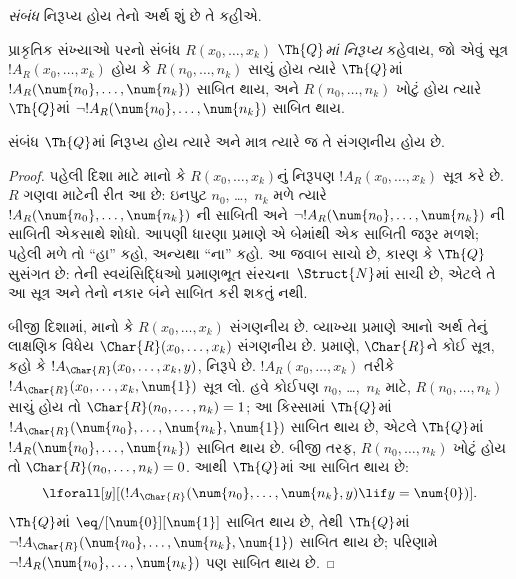\begingroup
\makeatletter{}\makeatother


\label{guunit:OLP-0298}


\emph{સંબંધ} નિરૂપ્ય હોય તેનો
અર્થ શું છે તે કહીએ.

\begin{defn}
પ્રાકૃતિક સંખ્યાઓ પરનો સંબંધ
$R(x_0,\dots,x_k)$ {\em
$\Th{Q}$માં નિરૂપ્ય} કહેવાય,
જો એવું સૂત્ર $!A_R(x_0,\dots,x_k)$
હોય કે $R(n_0,\dots,n_k)$
સાચું હોય ત્યારે
$\Th{Q}$માં
$!A_R(\num{n_0},\dots,\num{n_k})$
સાબિત થાય, અને
$R(n_0,\dots,n_k)$ ખોટું હોય
ત્યારે $\Th{Q}$માં
$\lnot !A_R(\num{n_0},
\dots, \num{n_k})$ સાબિત થાય.
\end{defn}

\begin{thm}
સંબંધ $\Th{Q}$માં નિરૂપ્ય
હોય ત્યારે અને માત્ર ત્યારે જ
તે સંગણનીય હોય છે.
\end{thm}

\begin{proof}
પહેલી દિશા માટે માનો કે
$R(x_0,\dots,x_k)$નું નિરૂપણ
$!A_R(x_0,\dots,x_k)$ સૂત્ર
કરે છે. $R$ ગણવા માટેની
રીત આ છે: ઇનપુટ
$n_0$, \dots,~$n_k$ મળે ત્યારે
$!A_R(\num{n_0}, \dots, \num{n_k})$
ની સાબિતી અને
$\lnot !A_R(\num{n_0}, \dots, \num{n_k})$
ની સાબિતી એકસાથે શોધો.
આપણી ધારણા પ્રમાણે એ બેમાંથી
એક સાબિતી જરૂર મળશે; પહેલી
મળે તો ``હા'' કહો, અન્યથા
``ના'' કહો.
આ જવાબ સાચો છે, કારણ કે $\Th{Q}$ સુસંગત છે:
તેની સ્વયંસિદ્ધિઓ પ્રમાણભૂત સંરચના~$\Struct{N}$માં સાચી છે,
એટલે તે આ સૂત્ર અને તેનો નકાર બંને સાબિત કરી શકતું નથી.

બીજી દિશામાં, માનો કે
$R(x_0, \dots, x_k)$ સંગણનીય
છે. વ્યાખ્યા પ્રમાણે આનો અર્થ
તેનું લાક્ષણિક વિધેય
$\Char{R}(x_0, \dots, x_k)$
સંગણનીય છે. 
પ્રમાણે, $\Char{R}$ને કોઈ
સૂત્ર, કહો કે
$!A_{\Char{R}}(x_0, \dots, x_k,
y)$, નિરૂપે છે.
$!A_R(x_0, \dots, x_k)$ તરીકે
$!A_{\Char{R}}(x_0,
\dots, x_k, \num{1})$ સૂત્ર
લો. હવે કોઈપણ $n_0$,
\dots,~$n_k$ માટે,
$R(n_0, \dots, n_k)$ સાચું
હોય તો $\Char{R}(n_0, \dots,
n_k) = 1$; આ કિસ્સામાં
$\Th{Q}$માં
$!A_{\Char{R}}(\num{n_0}, \dots, \num{n_k},
\num{1})$ સાબિત થાય છે,
એટલે $\Th{Q}$માં
$!A_R(\num{n_0}, \dots,
\num{n_k})$ સાબિત થાય છે.
બીજી તરફ, $R(n_0, \dots,
n_k)$ ખોટું હોય તો
$\Char{R}(n_0, \dots, n_k) = 0$.
આથી $\Th{Q}$માં આ સાબિત થાય છે:
\[
\lforall[y][(!A_{\Char{R}}(\num{n_0}, \dots, \num{n_k}, y) \lif y =
  \num{0})].
\]
$\Th{Q}$માં
$\eq/[\num{0}][\num{1}]$
સાબિત થાય છે, તેથી
$\Th{Q}$માં
$\lnot !A_{\Char{R}}(\num{n_0}, \dots, \num{n_k}, \num{1})$
સાબિત થાય છે; પરિણામે
$\lnot !A_R(\num{n_0}, \dots, \num{n_k})$
પણ સાબિત થાય છે.
\end{proof}

